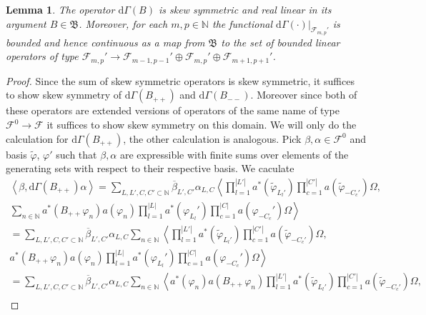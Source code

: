 \documentclass[b5paper,draft,openbib,12pt]{memoir}
\newtheorem{Lemma}[Def]{Lemma}
\begin{document}
\begin{Lemma}
The operator \(\mathrm{d}\Gamma(B)\)
is skew symmetric and real linear in its argument 
\(B\in\mathfrak{B}\).
Moreover, for each \(m,p\in\mathbb{N}\) the functional 
\(\mathrm{d}\Gamma(\cdot)|_{\mathcal{F}_{m,p}'}\)
is bounded and hence continuous as a map from \(\mathfrak{B}\)
to the set of bounded linear operators of type 
\(\mathcal{F}_{m,p}'\rightarrow \mathcal{F}_{m-1,p-1}'\oplus \mathcal{F}_{m,p}'\oplus\mathcal{F}_{m+1,p+1}'\).
\end{Lemma}
\begin{proof}
Since the sum of skew symmetric operators is skew symmetric, it suffices to show skew symmetry of \(\mathrm{d}\Gamma(B_{++})\) and \(\mathrm{d}\Gamma(B_{--})\).
Moreover since both of these operators are extended versions of operators of the same name of type \(\mathcal{F}^0\rightarrow \mathcal{F}\) it suffices to show skew symmetry
on this domain. We will only do the calculation for \(\mathrm{d}\Gamma(B_{++})\), the other calculation is analogous. 
Pick \(\beta,\alpha \in \mathcal{F}^0\) and basis \(\tilde{\varphi}\), \(\varphi'\)
such that \(\beta,\alpha\) are expressible with finite sums over 
elements of the generating sets with respect to their respective basis. 
We caculate
\begin{align}\nonumber
\left\langle \beta, \mathrm{d}\Gamma(B_{++}) \alpha \right\rangle
= \sum_{L,L',C,C'\subset \mathbb{N}} \overline{\beta}_{L',C'}\alpha_{L,C} 
\left\langle \prod_{l=1}^{|L'|}a^*(\tilde{\varphi}_{L_l'})\prod_{c=1}^{|C'|} a(\tilde{\varphi}_{-C_c'})\Omega,\right. \\ \nonumber
\left. \sum_{n\in\mathbb{N}} a^*(B_{++}\varphi_{n})a(\varphi_n) \prod_{l=1}^{|L|}a^*(\varphi_{L_l}')\prod_{c=1}^{|C|} a(\varphi_{-C_c}')\Omega\right\rangle\\\nonumber
= \sum_{L,L',C,C'\subset \mathbb{N}} \overline{\beta}_{L',C'}\alpha_{L,C} \sum_{n\in\mathbb{N}}
\left\langle \prod_{l=1}^{|L'|}a^*(\tilde{\varphi}_{L_l'})\prod_{c=1}^{|C'|} a(\tilde{\varphi}_{-C_c'})\Omega,\right. \\ \nonumber
\left. a^*(B_{++}\varphi_{n})a(\varphi_n) \prod_{l=1}^{|L|}a^*(\varphi_{L_l}')\prod_{c=1}^{|C|} a(\varphi_{-C_c}')\Omega\right\rangle\\\nonumber
= \sum_{L,L',C,C'\subset \mathbb{N}} \overline{\beta}_{L',C'}\alpha_{L,C} \sum_{n\in\mathbb{N}}
\left\langle a^*(\varphi_n) a(B_{++}\varphi_{n})\prod_{l=1}^{|L'|}a^*(\tilde{\varphi}_{L_l'})\prod_{c=1}^{|C'|} a(\tilde{\varphi}_{-C_c'})\Omega,\right. \\ \nonumber

\end{align}
\end{proof}
\end{document}
